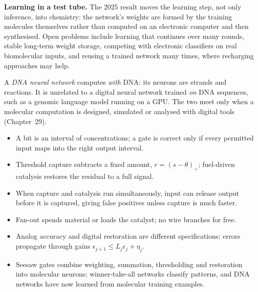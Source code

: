 \begin{Frontier}
\textbf{Learning in a test tube.} The 2025 result moves the learning step, not
only inference, into chemistry: the network's weights are formed by the training
molecules themselves rather than computed on an electronic computer and then
synthesised.\cite{CherryQian2025} Open problems include learning that continues
over many rounds, stable long-term weight storage, competing with electronic
classifiers on real biomolecular inputs, and reusing a trained network many
times, where recharging approaches may help.\cite{SongQian2025}
\end{Frontier}

\begin{Pitfall}
A \emph{DNA neural network} computes \emph{with} DNA: its neurons are strands and
reactions. It is unrelated to a digital neural network trained \emph{on} DNA
sequences, such as a genomic language model running on a GPU. The two meet only
when a molecular computation is designed, simulated or analysed with digital
tools (Chapter~29).
\end{Pitfall}

\begin{KeyIdeas}
\begin{itemize}\setlength{\itemsep}{2pt}
\item A bit is an interval of concentrations; a gate is correct only if every
permitted input maps into the right output interval.
\item Threshold capture subtracts a fixed amount, $r=(s-\theta)_+$; fuel-driven
catalysis restores the residual to a full signal.
\item When capture and catalysis run simultaneously, input can release output
before it is captured, giving false positives unless capture is much faster.
\item Fan-out spends material or loads the catalyst; no wire branches for free.
\item Analog accuracy and digital restoration are different specifications;
errors propagate through gains $\epsilon_{j+1}\le L_j\epsilon_j+\eta_j$.
\item Seesaw gates combine weighting, summation, thresholding and restoration
into molecular neurons; winner-take-all networks classify patterns, and DNA
networks have now learned from molecular training examples.
\end{itemize}
\end{KeyIdeas}

